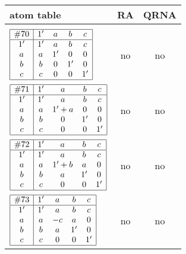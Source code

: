 \documentclass[12pt]{article}
\newcommand{\join}{\mathbin{+}}%
\newcommand{\id}{{1'}}%
\begin{document}
\begin{center}
\begin{longtable}{l|c|c}
  atom table & RA  & QRNA \\ \hline && \\[-4mm]  \endhead 
  \hline \endfoot 
 
$
\begin{array}{|c|cccc|} \hline
\#70 & \id & a & b & c \\ \hline
\id & \id & a & b & c \\
a & a & \id & 0 & 0 \\
b & b & 0 & \id & 0 \\
c & c & 0 & 0 & \id \\ \hline
\end{array}
$
 & no  
 & no      \\[15mm]

$
\begin{array}{|c|cccc|} \hline
\#71 & \id & a & b & c \\ \hline
\id & \id & a & b & c \\
a & a & \id \join a & 0 & 0 \\
b & b & 0 & \id & 0 \\
c & c & 0 & 0 & \id \\ \hline
\end{array}
$
 & no  
 & no      \\[15mm]

$
\begin{array}{|c|cccc|} \hline
\#72 & \id & a & b & c \\ \hline
\id & \id & a & b & c \\
a & a & \id \join b & a & 0 \\
b & b & a & \id & 0 \\
c & c & 0 & 0 & \id \\ \hline
\end{array}
$
 & no  
 & no      \\[15mm]

$
\begin{array}{|c|cccc|} \hline
\#73 & \id & a & b & c \\ \hline
\id & \id & a & b & c \\
a & a & -c & a & 0 \\
b & b & a & \id & 0 \\
c & c & 0 & 0 & \id \\ \hline
\end{array}
$
 & no  
 & no      \\[15mm]


\end{longtable}
\end{center}
\end{document}
